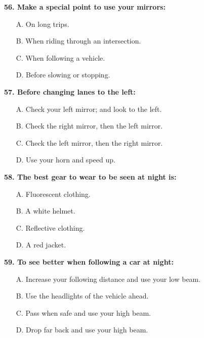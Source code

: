 \begin{minipage}{\linewidth}
\vspace{1em}\noindent\textbf{56. Make a special point to use your mirrors:}

\begin{itemize}[nosep,leftmargin=2em]
\item [A.] On long trips.
\item [B.] When riding through an intersection.
\item [C.] When following a vehicle.
\item [D.] Before slowing or stopping.

\end{itemize}
\end{minipage}


\begin{minipage}{\linewidth}
\vspace{1em}\noindent\textbf{57. Before changing lanes to the left:}

\begin{itemize}[nosep,leftmargin=2em]
\item [A.] Check your left mirror; and look to the left.
\item [B.] Check the right mirror, then the left mirror.
\item [C.] Check the left mirror, then the right mirror.
\item [D.] Use your horn and speed up.

\end{itemize}
\end{minipage}


\begin{minipage}{\linewidth}
\vspace{1em}\noindent\textbf{58. The best gear to wear to be seen at night is:}

\begin{itemize}[nosep,leftmargin=2em]
\item [A.] Fluorescent clothing.
\item [B.] A white helmet.
\item [C.] Reflective clothing.
\item [D.] A red jacket.

\end{itemize}
\end{minipage}


\begin{minipage}{\linewidth}
\vspace{1em}\noindent\textbf{59. To see better when following a car at night:}

\begin{itemize}[nosep,leftmargin=2em]
\item [A.] Increase your following distance and use your low beam.
\item [B.] Use the headlights of the vehicle ahead.
\item [C.] Pass when safe and use your high beam.
\item [D.] Drop far back and use your high beam.

\end{itemize}
\end{minipage}


